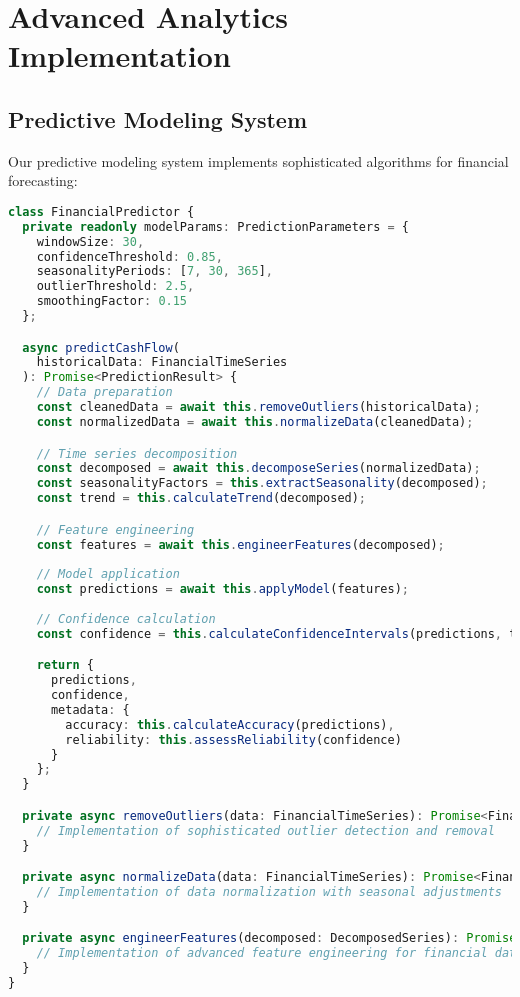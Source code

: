 \documentclass[conference]{IEEEtran}
\begin{document}
\section{Advanced Analytics Implementation}
\subsection{Predictive Modeling System}
Our predictive modeling system implements sophisticated algorithms for financial forecasting:

\begin{lstlisting}[language=TypeScript, caption=Advanced Predictive Analytics Implementation]
class FinancialPredictor {
  private readonly modelParams: PredictionParameters = {
    windowSize: 30,
    confidenceThreshold: 0.85,
    seasonalityPeriods: [7, 30, 365],
    outlierThreshold: 2.5,
    smoothingFactor: 0.15
  };

  async predictCashFlow(
    historicalData: FinancialTimeSeries
  ): Promise<PredictionResult> {
    // Data preparation
    const cleanedData = await this.removeOutliers(historicalData);
    const normalizedData = await this.normalizeData(cleanedData);

    // Time series decomposition
    const decomposed = await this.decomposeSeries(normalizedData);
    const seasonalityFactors = this.extractSeasonality(decomposed);
    const trend = this.calculateTrend(decomposed);

    // Feature engineering
    const features = await this.engineerFeatures(decomposed);
    
    // Model application
    const predictions = await this.applyModel(features);
    
    // Confidence calculation
    const confidence = this.calculateConfidenceIntervals(predictions, trend);

    return {
      predictions,
      confidence,
      metadata: {
        accuracy: this.calculateAccuracy(predictions),
        reliability: this.assessReliability(confidence)
      }
    };
  }

  private async removeOutliers(data: FinancialTimeSeries): Promise<FinancialTimeSeries> {
    // Implementation of sophisticated outlier detection and removal
  }

  private async normalizeData(data: FinancialTimeSeries): Promise<FinancialTimeSeries> {
    // Implementation of data normalization with seasonal adjustments
  }

  private async engineerFeatures(decomposed: DecomposedSeries): Promise<FeatureSet> {
    // Implementation of advanced feature engineering for financial data
  }
}
\end{lstlisting}
\end{document}
